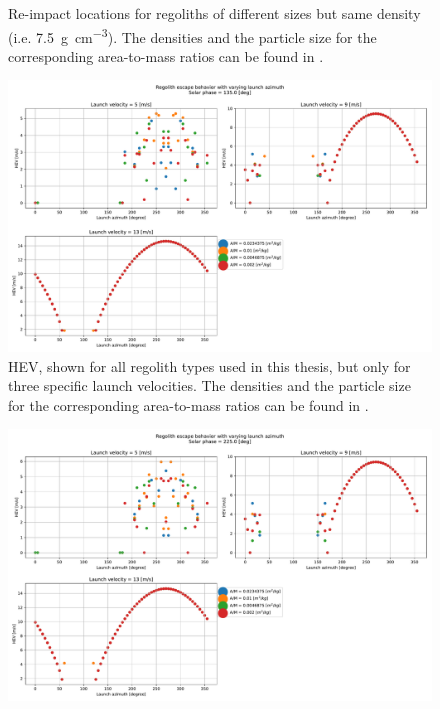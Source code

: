 \documentclass[print]{tudelft-report}
\begin{document}
\begin{appendices}
\begin{figure}[htb]
    \caption{Re-impact locations for regoliths of different sizes but same density (i.e. \SI{7.5}{\gram\per\centi\metre\cubed}). The densities and the particle size for the corresponding area-to-mass ratios can be found in .}
    \label{fig:crashmap_7.5_density_1cm_5cmRadius}
    \end{figure}
    \FloatBarrier
    \begin{figure}[htb]
    \centering
    \captionsetup{justification=centering}
    \includegraphics[width=\textwidth, height=0.5\textheight, keepaspectratio=true]{Results/Images/longest_edge_perturbations/multiple_regolith_types/phase135_escapeHEV.pdf}
    \caption{\gls{HEV}, shown for all regolith types used in this thesis, but only for three specific launch velocities. The densities and the particle size for the corresponding area-to-mass ratios can be found in .}
    \label{fig:longestEdge_allParticles_escape_hev_solarPhase135}
    \end{figure}
    \FloatBarrier
    \begin{figure}[htb]
    \centering
    \captionsetup{justification=centering}
    \includegraphics[width=\textwidth, height=0.5\textheight, keepaspectratio=true]{Results/Images/longest_edge_perturbations/multiple_regolith_types/phase225_escapeHEV.pdf}

\end{figure}
\end{appendices}
\end{document}
